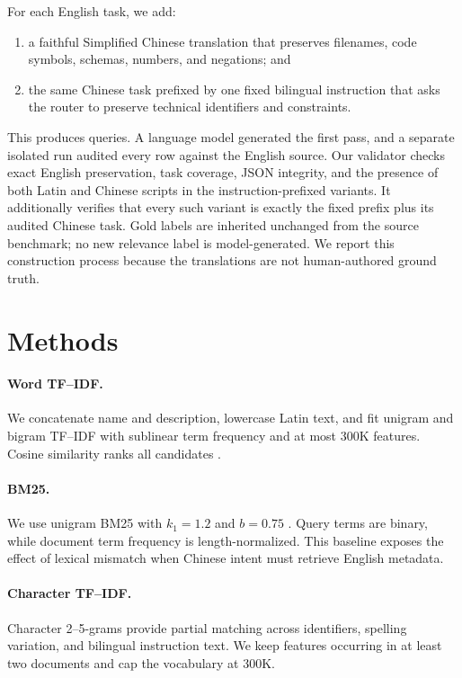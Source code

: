 \documentclass[letterpaper]{article}
\begin{document}
For each English task, we add:
\begin{enumerate}
  \item a faithful Simplified Chinese translation that preserves filenames,
  code symbols, schemas, numbers, and negations; and
  \item the same Chinese task prefixed by one fixed bilingual instruction that
  asks the router to preserve technical identifiers and constraints.
\end{enumerate}
This produces \PublicVariantCount{} queries.  A language model generated the
first pass, and a separate isolated run audited every row against the English
source.  Our validator checks exact English preservation, task coverage, JSON
integrity, and the presence of both Latin and Chinese scripts in the
instruction-prefixed variants.  It additionally verifies that every such variant is
exactly the fixed prefix plus its audited Chinese task.  Gold labels are
inherited unchanged from the source benchmark; no new relevance label is
model-generated.  We report this construction process because the
translations are not human-authored ground truth.

\section{Methods}

\paragraph{Word TF--IDF.}
We concatenate name and description, lowercase Latin text, and fit unigram and
bigram TF--IDF with sublinear term frequency and at most 300K features.
Cosine similarity ranks all candidates \cite{salton1988term}.

\paragraph{BM25.}
We use unigram BM25 with $k_1=1.2$ and $b=0.75$
\cite{robertson2009bm25}.  Query terms are binary, while document term
frequency is length-normalized.  This baseline exposes the effect of lexical
mismatch when Chinese intent must retrieve English metadata.

\paragraph{Character TF--IDF.}
Character 2--5-grams provide partial matching across identifiers, spelling
variation, and bilingual instruction text.  We keep features occurring in at least two
documents and cap the vocabulary at 300K.
\end{document}
